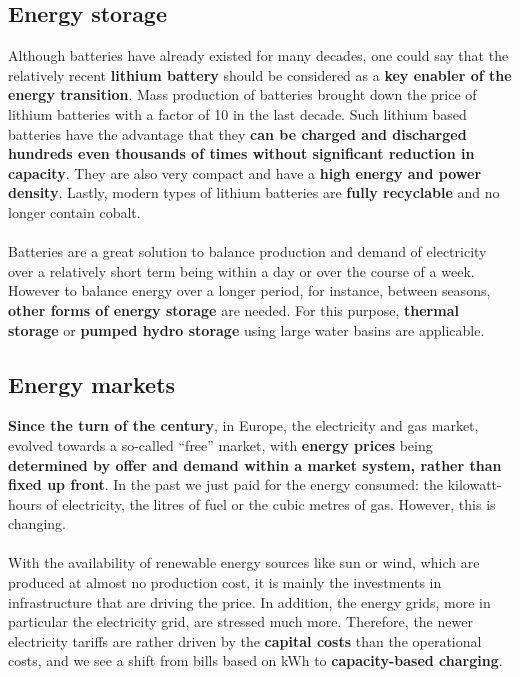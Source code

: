 \documentclass[../summary.tex]{subfiles}
\begin{document}
\subsection{Energy storage}

Although batteries have already existed for many decades, one could say that the relatively recent \textbf{lithium battery} should be considered as a \textbf{key enabler of the energy transition}. Mass production of batteries brought down the price of lithium batteries with a factor of 10 in the last decade. Such lithium based batteries have the advantage that they \textbf{can be charged and discharged hundreds even thousands of times without significant reduction in capacity}. They are also very compact and have a \textbf{high energy and power density}. Lastly, modern types of lithium batteries are \textbf{fully recyclable} and no longer contain cobalt.
\\\\
Batteries are a great solution to balance production and demand of electricity over a relatively short term being within a day or over the course of a week. However to balance energy over a longer period, for instance, between seasons, \textbf{other forms of energy storage} are needed. For this purpose, \textbf{thermal storage} or \textbf{pumped hydro storage} using large water basins are applicable.

\subsection{Energy markets}

\textbf{ Since the turn of the century}, in Europe, the electricity and gas market, evolved towards a so-called “free” market, with \textbf{energy prices} being\textbf{ determined by offer and demand within a market system, rather than fixed up front}. In the past we just paid for the energy consumed: the kilowatt-hours of electricity, the litres of fuel or the cubic metres of gas. However, this is changing.
\\\\
With the availability of renewable energy sources like sun or wind, which are produced at almost no production cost, it is mainly the investments in infrastructure that are driving the price. In addition, the energy grids, more in particular the electricity grid, are stressed much more. Therefore, the newer electricity tariffs are rather driven by the \textbf{capital costs} than the operational costs, and we see a shift from bills based on \unit{\kWh} to \textbf{capacity-based charging}.
\end{document}
